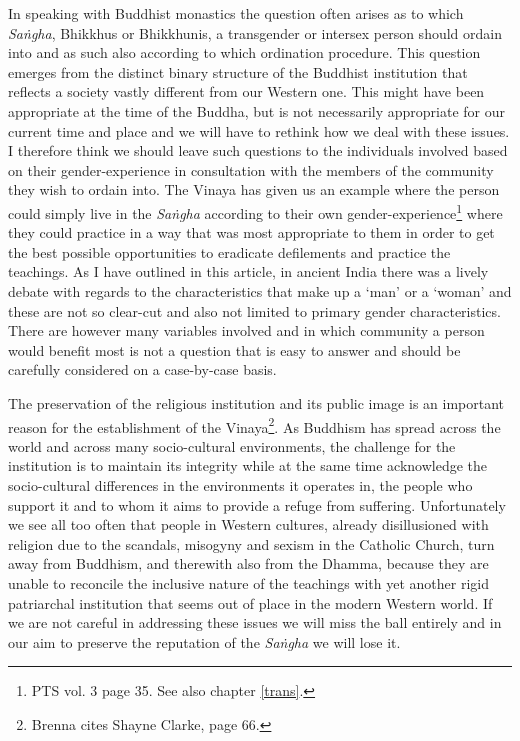 In speaking with Buddhist monastics the question often arises as to which {\em Saṅgha}, Bhikkhus or Bhikkhunis, a transgender or intersex person should ordain into and as such also according to which ordination procedure. This question emerges from the distinct binary structure of the Buddhist institution that reflects a society vastly different from our Western one. This might have been appropriate at the time of the Buddha, but is not necessarily appropriate for our current time and place and we will have to rethink how we deal with these issues. I therefore think we should leave such questions to the individuals involved based on their gender-experience in consultation with the members of the community they wish to ordain into. The Vinaya has given us an example where the person could simply live in the {\em Saṅgha} according to their own gender-experience\footnote{PTS vol. 3 page 35. See also chapter \ref{trans}.} where they could practice in a way that was most appropriate to them in order to get the best possible opportunities to eradicate defilements and practice the teachings. As I have outlined in this article, in ancient India there was a lively debate with regards to the characteristics that make up a `man' or a `woman' and these are not so clear-cut and also not limited to primary gender characteristics. There are however many variables involved and in which community a person would benefit most is not a question that is easy to answer and should be carefully considered on a case-by-case basis. 

The preservation of the religious institution and its public image is an important reason for the establishment of the Vinaya\footnote{Brenna \cite{artinger} cites Shayne Clarke, page 66.}. As Buddhism has spread across the world and across many socio-cultural environments, the challenge for the institution is to maintain its integrity while at the same time acknowledge the socio-cultural differences in the environments it operates in, the people who support it and to whom it aims to provide a refuge from suffering. Unfortunately we see all too often that people in Western cultures, already disillusioned with religion due to the scandals, misogyny and sexism in the Catholic Church, turn away from Buddhism, and therewith also from the Dhamma, because they are unable to reconcile the inclusive nature of the teachings with yet another rigid patriarchal institution that seems out of place in the modern Western world. If we are not careful in addressing these issues we will miss the ball entirely and in our aim to preserve the reputation of the {\em Saṅgha} we will lose it.

